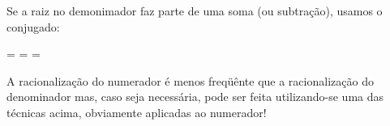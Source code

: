 \documentclass[pdftex, brazil, 12pt, oneside]{article}
\begin{document}
Se a raiz no demonimador faz parte de uma soma (ou subtração), usamos
o conjugado:
\begin{tcolorbox}
  \label{eqn:racionalizacao3}
   = \times{} =  = 
\end{tcolorbox}

A racionalização do numerador é menos freqüênte que a racionalização
do denominador mas, caso seja necessária, pode ser feita utilizando-se
uma das técnicas acima, obviamente aplicadas ao numerador!




\end{document}
